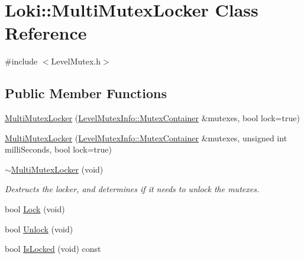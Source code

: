 \hypertarget{classLoki_1_1MultiMutexLocker}{}\section{Loki\+:\+:Multi\+Mutex\+Locker Class Reference}
\label{classLoki_1_1MultiMutexLocker}


{\ttfamily \#include $<$Level\+Mutex.\+h$>$}

\subsection*{Public Member Functions}
\begin{DoxyCompactItemize}
\item 
\hyperlink{classLoki_1_1MultiMutexLocker_aaa646ae058e3273651f89bfbb276cf42}{Multi\+Mutex\+Locker} (\hyperlink{classLoki_1_1LevelMutexInfo_a76a0315d91234f5066c75660a9f27a7f}{Level\+Mutex\+Info\+::\+Mutex\+Container} \&mutexes, bool lock=true)
\item 
\hyperlink{classLoki_1_1MultiMutexLocker_aa88fcf2068f0c4292e2f25fcd29c3e33}{Multi\+Mutex\+Locker} (\hyperlink{classLoki_1_1LevelMutexInfo_a76a0315d91234f5066c75660a9f27a7f}{Level\+Mutex\+Info\+::\+Mutex\+Container} \&mutexes, unsigned int milli\+Seconds, bool lock=true)
\item 
\hypertarget{classLoki_1_1MultiMutexLocker_ab3f3fa705ae220da3e5be02e65d6ef10}{}\hyperlink{classLoki_1_1MultiMutexLocker_ab3f3fa705ae220da3e5be02e65d6ef10}{$\sim$\+Multi\+Mutex\+Locker} (void)\label{classLoki_1_1MultiMutexLocker_ab3f3fa705ae220da3e5be02e65d6ef10}

\begin{DoxyCompactList}\small\item\em Destructs the locker, and determines if it needs to unlock the mutexes. \end{DoxyCompactList}\item 
bool \hyperlink{classLoki_1_1MultiMutexLocker_a9ce26d13eb156c9a8b7fa6228bf6724f}{Lock} (void)
\item 
bool \hyperlink{classLoki_1_1MultiMutexLocker_a18bfdec10dd2e65e128d64a80e42407f}{Unlock} (void)
\item 
\hypertarget{classLoki_1_1MultiMutexLocker_a1bdfd6380329fff07890d2bc0e67427f}{}bool \hyperlink{classLoki_1_1MultiMutexLocker_a1bdfd6380329fff07890d2bc0e67427f}{Is\+Locked} (void) const \label{classLoki_1_1MultiMutexLocker_a1bdfd6380329fff07890d2bc0e67427f}


\end{DoxyCompactItemize}
